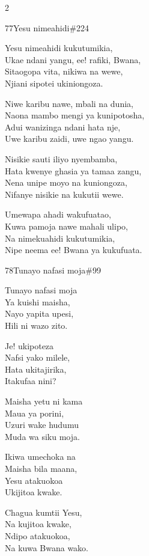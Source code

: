 \documentclass{article}
\begin{document}
\begin{multicols}{2}
\begin{hymn}{77}{Yesu nimeahidi}{\#224}
\begin{stanza}
Yesu nimeahidi kukutumikia,\\
Ukae ndani yangu, ee! rafiki, Bwana,\\
Sitaogopa vita, nikiwa na wewe,\\
Njiani sipotei ukiniongoza.
\end{stanza}
\begin{stanza}
Niwe karibu nawe, mbali na dunia,\\
Naona mambo mengi ya kunipotosha,\\
Adui wanizinga ndani hata nje,\\
Uwe karibu zaidi, uwe ngao yangu.
\end{stanza}
\begin{stanza}
Nisikie sauti iliyo nyembamba,\\
Hata kwenye ghasia ya tamaa zangu,\\
Nena unipe moyo na kuniongoza,\\
Nifanye nisikie na kukutii wewe.
\end{stanza}
\begin{stanza}
Umewapa ahadi wakufuatao,\\
Kuwa pamoja nawe mahali ulipo,\\
Na nimekuahidi kukutumikia,\\
Nipe neema ee! Bwana ya kukufuata.
\end{stanza}
\end{hymn}

\begin{hymn}{78}{Tunayo nafasi moja}{\#99}
\begin{stanza}
Tunayo nafasi moja\\
Ya kuishi maisha,\\
Nayo yapita upesi,\\
Hili ni wazo zito.
\end{stanza}
\begin{chorus}
Je! ukipoteza\\
Nafsi yako milele,\\
Hata ukitajirika,\\
Itakufaa nini?
\end{chorus}
\begin{stanza}
Maisha yetu ni kama\\
Maua ya porini,\\
Uzuri wake hudumu\\
Muda wa siku moja.
\end{stanza}
\begin{stanza}
Ikiwa umechoka na\\
Maisha bila maana,\\
Yesu atakuokoa\\
Ukijitoa kwake.
\end{stanza}
\begin{stanza}
Chagua kumtii Yesu,\\
Na kujitoa kwake,\\
Ndipo atakuokoa,\\
Na kuwa Bwana wako.
\end{stanza}
\end{hymn}


\end{multicols}
\end{document}
